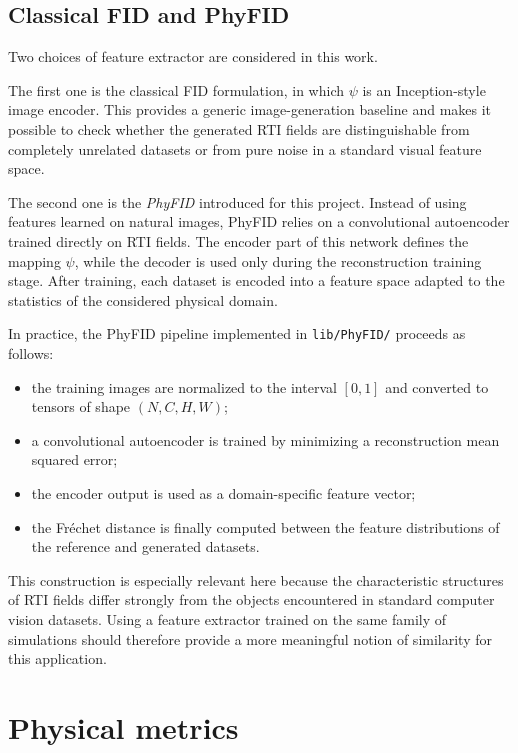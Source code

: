 \subsection{Classical FID and PhyFID}

Two choices of feature extractor are considered in this work.

The first one is the classical FID formulation, in which $\psi$ is an
Inception-style image encoder. This provides a generic image-generation
baseline and makes it possible to check whether the generated RTI fields are
distinguishable from completely unrelated datasets or from pure noise in a
standard visual feature space.

The second one is the \emph{PhyFID} introduced for this project. Instead of
using features learned on natural images, PhyFID relies on a convolutional
autoencoder trained directly on RTI fields. The encoder part of this network
defines the mapping $\psi$, while the decoder is used only during the
reconstruction training stage. After training, each dataset is encoded into a
feature space adapted to the statistics of the considered physical domain.

In practice, the PhyFID pipeline implemented in
\texttt{lib/PhyFID/} proceeds as follows:

\begin{itemize}
    \item the training images are normalized to the interval $[0,1]$ and
    converted to tensors of shape $(N,C,H,W)$;
    \item a convolutional autoencoder is trained by minimizing a reconstruction
    mean squared error;
    \item the encoder output is used as a domain-specific feature vector;
    \item the Fr\'echet distance is finally computed between the feature
    distributions of the reference and generated datasets.
\end{itemize}

This construction is especially relevant here because the characteristic
structures of RTI fields differ strongly from the objects encountered in
standard computer vision datasets. Using a feature extractor trained on the
same family of simulations should therefore provide a more meaningful notion of
similarity for this application.


\section{Physical metrics}

